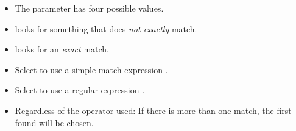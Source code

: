 
\begin{itemize}
\item The  parameter has four possible values. 
\item {} looks for something that does \emph{not exactly} match.
\item  {} looks for an \emph{exact} match.
\item Select  to use a simple match expression . 
\item Select  to use a regular expression . 
\item Regardless of the operator used: If there is more than one match, the first found will be chosen. 
\end{itemize}
